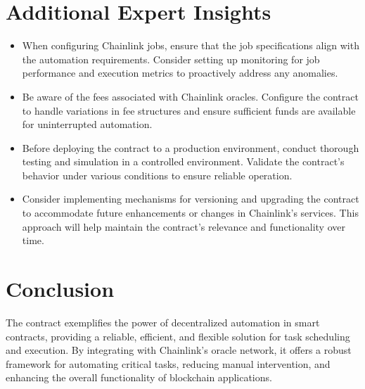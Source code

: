 \documentclass[a4paper,10pt,english]{sphinxmanual}
\begin{document}
\section{Additional Expert Insights}
\label{\detokenize{docs_chainlink_automation_contract:additional-expert-insights}}\begin{itemize}
\item {} 
\sphinxAtStartPar
{}
\sphinxhyphen{} When configuring Chainlink jobs, ensure that the job specifications align with the automation requirements. Consider setting up monitoring for job performance and execution metrics to proactively address any anomalies.

\item {} 
\sphinxAtStartPar
{}
\sphinxhyphen{} Be aware of the fees associated with Chainlink oracles. Configure the contract to handle variations in fee structures and ensure sufficient funds are available for uninterrupted automation.

\item {} 
\sphinxAtStartPar
{}
\sphinxhyphen{} Before deploying the  contract to a production environment, conduct thorough testing and simulation in a controlled environment. Validate the contract’s behavior under various conditions to ensure reliable operation.

\item {} 
\sphinxAtStartPar
{}
\sphinxhyphen{} Consider implementing mechanisms for versioning and upgrading the contract to accommodate future enhancements or changes in Chainlink’s services. This approach will help maintain the contract’s relevance and functionality over time.

\end{itemize}


\section{Conclusion}
\label{\detokenize{docs_chainlink_automation_contract:conclusion}}
\sphinxAtStartPar
The  contract exemplifies the power of decentralized automation in smart contracts, providing a reliable, efficient, and flexible solution for task scheduling and execution. By integrating with Chainlink’s oracle network, it offers a robust framework for automating critical tasks, reducing manual intervention, and enhancing the overall functionality of blockchain applications.
\end{document}
